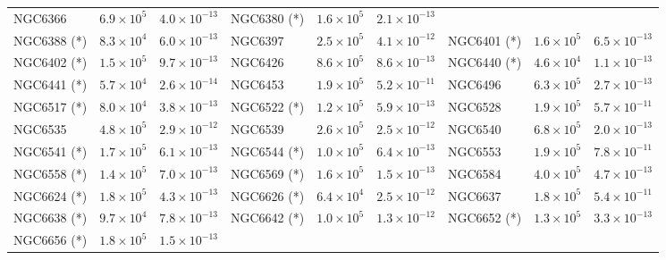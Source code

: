 \begin{table}
\begin{center}
\begin{tabular}{l | c | c | l |  c|   c | l | c | c }
            NGC6366 &  $6.9\times10^5$ &          $4.0\times10^{-13}$ &
            NGC6380 (*) &  $1.6\times10^5$ &          $2.1\times10^{-13}$ \\
            NGC6388 (*) &  $8.3\times10^4$ &          $6.0\times10^{-13}$ &
            NGC6397 &  $2.5\times10^5$ &          $4.1\times10^{-12}$ &
            NGC6401 (*) &  $1.6\times10^5$ &          $6.5\times10^{-13}$  \\
            NGC6402 (*) &  $1.5\times10^5$ &          $9.7\times10^{-13}$  &
            NGC6426 &  $8.6\times10^5$ &          $8.6\times10^{-13}$  &
            NGC6440 (*) &  $4.6\times10^4$ &         $ 1.1\times10^{-13}$  \\
            NGC6441 (*) &  $5.7\times10^4$ &          $2.6\times10^{-14}$  &
            NGC6453 &  $1.9\times10^5$ &          $5.2\times10^{-11}$  &
            NGC6496 &  $6.3\times10^5$ &          $2.7\times10^{-13}$  \\
            NGC6517 (*) &  $8.0\times10^4$ &          $3.8\times10^{-13}$  &
            NGC6522 (*) &  $1.2\times10^5$ &          $5.9\times10^{-13}$  &
            NGC6528 &  $1.9\times10^5$ &          $5.7\times10^{-11}$  \\
            NGC6535 &  $4.8\times10^5$ &        $  2.9\times10^{-12}$ &
            NGC6539 &  $2.6\times10^5$ &          $2.5\times10^{-12}$  &
            NGC6540 &  $6.8\times10^5$ &          $2.0\times10^{-13}$  \\
            NGC6541 (*) &  $1.7\times10^5$ &          $6.1\times10^{-13}$  &
            NGC6544 (*) &  $1.0\times10^5$ &          $6.4\times10^{-13}$  &
            NGC6553 &  $1.9\times10^5$ &          $7.8\times10^{-11}$  \\
            NGC6558 (*) &  $1.4\times10^5$ &          $7.0\times10^{-13}$  &
            NGC6569 (*) &  $1.6\times10^5$ &          $1.5\times10^{-13}$  &
            NGC6584 &  $4.0\times10^5$ &          $4.7\times10^{-13}$  \\
            NGC6624 (*) &  $1.8\times10^5$ &          $4.3\times10^{-13}$  &
            NGC6626 (*) &  $6.4\times10^4$ &          $2.5\times10^{-12}$  &
            NGC6637 &  $1.8\times10^5$ &          $5.4\times10^{-11}$  \\
            NGC6638 (*) &  $9.7\times10^4$ &          $7.8\times10^{-13}$  &
            NGC6642 (*) &  $1.0\times10^5$ &          $1.3\times10^{-12}$ &
            NGC6652 (*)&  $1.3\times10^5$ &          $3.3\times10^{-13}$  \\
            NGC6656 (*) &  $1.8\times10^5$ &          $1.5\times10^{-13}$ &

\end{tabular}
\end{center}
\end{table}
